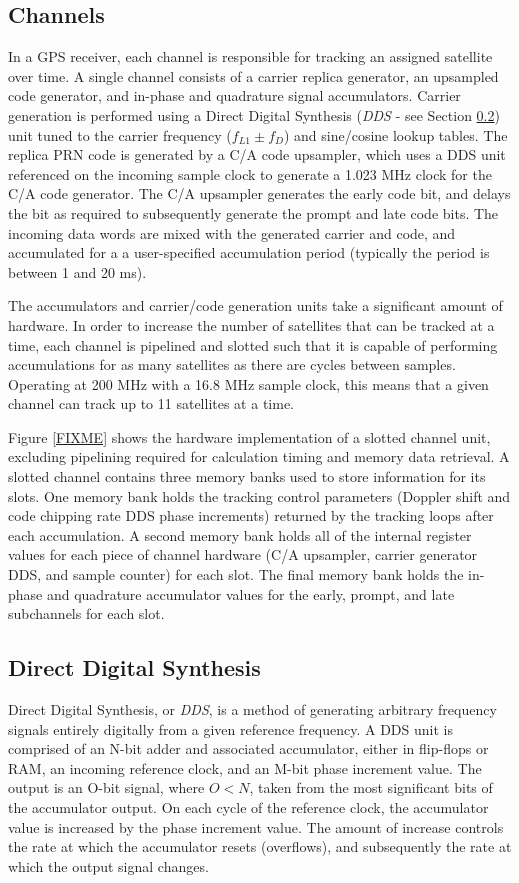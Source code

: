 \documentclass[12pt]{article}
\begin{document}
\subsection{Channels}
In a GPS receiver, each channel is responsible for tracking an assigned satellite over time. A single channel consists of a carrier replica generator, an upsampled code generator, and in-phase and quadrature signal accumulators. Carrier generation is performed using a Direct Digital Synthesis (\emph{DDS} - see Section \ref{sec:dds}) unit tuned to the carrier frequency ($f_{L1} \pm f_D$) and sine/cosine lookup tables. The replica PRN code is generated by a C/A code upsampler, which uses a DDS unit referenced on the incoming sample clock to generate a 1.023 MHz clock for the C/A code generator. The C/A upsampler generates the early code bit, and delays the bit as required to subsequently generate the prompt and late code bits. The incoming data words are mixed with the generated carrier and code, and accumulated for a a user-specified accumulation period (typically the period is between 1 and 20 ms).

The accumulators and carrier/code generation units take a significant amount of hardware. In order to increase the number of satellites that can be tracked at a time, each channel is pipelined and slotted such that it is capable of performing accumulations for as many satellites as there are cycles between samples. Operating at 200 MHz with a 16.8 MHz sample clock, this means that a given channel can track up to 11 satellites at a time.


Figure \ref{FIXME} shows the hardware implementation of a slotted channel unit, excluding pipelining required for calculation timing and memory data retrieval. A slotted channel contains three memory banks used to store information for its slots. One memory bank holds the tracking control parameters (Doppler shift and code chipping rate DDS phase increments) returned by the tracking loops after each accumulation. A second memory bank holds all of the internal register values for each piece of channel hardware (C/A upsampler, carrier generator DDS, and sample counter) for each slot. The final memory bank holds the in-phase and quadrature accumulator values for the early, prompt, and late subchannels for each slot.

\subsection{Direct Digital Synthesis}
\label{sec:dds}
Direct Digital Synthesis, or \emph{DDS}, is a method of generating arbitrary frequency signals entirely digitally from a given reference frequency. A DDS unit is comprised of an N-bit adder and associated accumulator, either in flip-flops or RAM, an incoming reference clock, and an M-bit phase increment value. The output is an O-bit signal, where $O<N$, taken from the most significant bits of the accumulator output. On each cycle of the reference clock, the accumulator value is increased by the phase increment value. The amount of increase controls the rate at which the accumulator resets (overflows), and subsequently the rate at which the output signal changes.
\end{document}
